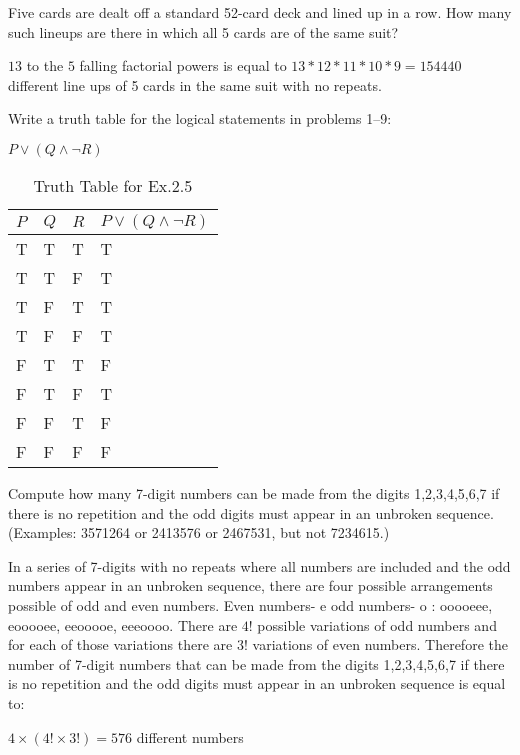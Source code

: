 \documentclass{article}
\begin{document}
\begin{description}
\item[Exercises for Section 3.1]

\item[4.]  Five cards are dealt off a standard 52-card deck and
  lined up in a row.  How many such lineups are there in
  which all 5 cards are of the same suit?
\item $13$ to the $5$ falling factorial powers is equal to $13 * 12 * 11 * 10 * 9 = 154440$ different line ups of 5 cards in the same suit with no repeats.

\item[Exercises for Section 2.5] Write a truth table for the logical
  statements in problems 1--9:

\item[8.] $P \vee (Q \wedge \neg R)$

\begin{table}
\caption{Truth Table for Ex.2.5}
\centering
\begin{tabular}{|l|l|l|l|}
\hline
$P$ & $Q$ & $R$ & $P \vee (Q \wedge \neg R)$ \\
\hline
T & T& T& T\\
\hline
T & T& F& T\\
\hline
T & F & T & T\\
\hline
T & F & F & T\\
\hline
F & T& T & F\\
\hline
F & T& F & T\\
\hline
F & F & T & F\\
\hline
F & F & F& F\\\hline
\end{tabular}
\end{table}

\item[Exercises for Section 3.2]

\item[8.] Compute how many 7-digit numbers can be made from the digits
  1,2,3,4,5,6,7 if there is no repetition and the odd digits
  must appear in an unbroken sequence.  (Examples: 3571264 or 2413576 or
  2467531, but not 7234615.)
\item In a series of 7-digits with no repeats where all numbers are included and the odd numbers appear in an unbroken sequence, there are four possible arrangements possible of odd and even numbers. Even numbers- e odd numbers- o : ooooeee, eooooee, eeooooe, eeeoooo. There are $4!$ possible variations of odd numbers and for each of those variations there are $3!$ variations of even numbers. Therefore the number of 7-digit numbers that can be made from the digits
  1,2,3,4,5,6,7 if there is no repetition and the odd digits
  must appear in an unbroken sequence is equal to:
  \item $4\times(4!\times 3!) = 576$ different numbers


\end{description}
\end{document}
